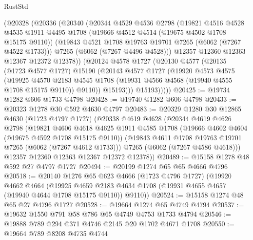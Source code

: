 \begin{lexlean}{RustStd}
\begin{coremodule}
        (@20328
          (@20336
            (@20340
              (@20344
                @4529
                @4536
                @2798
                (@19821
                  @4516
                  @4528
                  @4535
                  @1911
                  @4495
                  @1708
                  (@19666 @4512 @4514 (@19675 @4502 @1708 @15175 @9110))
                  (@19843 @4521 @1708 @19763 @19701 @7265 (@6062 (@7267 @4522 @1733)))
                  @7265
                  (@6062 (@7267 @4496 @4528)))
                @12357
                @12360
                @12363
                @12367
                @12372
                @12378))
            (@20124
              @4578
              @1727
              (@20130
                @4577
                (@20135
                  (@1723 @4577 @1727)
                  @15190
                  (@20143
                    @4577
                    @1727
                    (@19920
                      @4573
                      @4575
                      (@19925
                        @4570
                        @2183
                        @4545
                        @1708
                        (@19931 @4566 @4568 (@19940 @4555 @1708 @15175 @9110))
                        @9110))
                    @15193)))
              @15193)))))
@20425 := @19734 @1282 @606 @1733 @4798
@20428 := @19740 @1282 @606 @4798
@20433 := @20323 @1278 @30 @592 @4630 @4797
@20483 := @20329
    @1280
    @30
    @12865
    @4630
    (@1723 @4797 @1727)
    (@20338
      @4619
      @4628
      (@20344
        @4619
        @4626
        @2798
        (@19821
          @4606
          @4618
          @4625
          @1911
          @4585
          @1708
          (@19666 @4602 @4604 (@19675 @4592 @1708 @15175 @9110))
          (@19843 @4611 @1708 @19763 @19701 @7265 (@6062 (@7267 @4612 @1733)))
          @7265
          (@6062 (@7267 @4586 @4618)))
        @12357
        @12360
        @12363
        @12367
        @12372
        @12378))
@20489 := @15158 @1278 @48 @592 @27 @4797 @1727
@20494 := @20199 @1274 @65 @65 @4666 @4796
@20518 := @20140
    @1276
    @65
    @623
    @4666
    (@1723 @4796 @1727)
    (@19920
      @4662
      @4664
      (@19925 @4659 @2183 @4634 @1708 (@19931 @4655 @4657 (@19940 @4644 @1708 @15175 @9110)) @9110))
@20524 := @15158 @1274 @48 @65 @27 @4796 @1727
@20528 := @19664 @1274 @65 @4749 @4794
@20537 := @19632 @1550 @791 @58 @786 @65 @4749 @4753 @1733 @4794
@20546 := @19888 @789 @294 @371 @4746 @2145 @20 @1702 @4671 @1708
@20550 := @19664 @789 @8208 @4735 @4744

\end{coremodule}
\end{lexlean}
